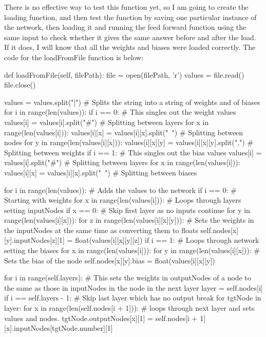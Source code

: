 \documentclass{report}
\begin{document}
There is no effective way to test this function yet, so I am going to create the loading function, and then test the function by saving one particular instance of the network, then loading it and running the feed forward function using the same input to check whether it gives the same answer before and after the load. If it does, I will know that all the weights and biases were loaded correctly.
\newpage
\noindent The code for the loadFromFile function is below:
\begin{python}
 def loadFromFile(self, filePath):
    file = open(filePath, 'r')
    values = file.read()
    file.close()
    
    values = values.split("|") # Splits the string into a string of weights and of biases
    for i in range(len(values)):
        if i == 0: # This singles out the weight values
            values[i] = values[i].split("#") # Splitting between layers
            for x in range(len(values[i])):
                values[i][x] = values[i][x].split("~") # Splitting between nodes
                for y in range(len(values[i][x])):
                    values[i][x][y] = values[i][x][y].split(",") # Splitting between weights
        if i == 1: # This singles out the bias values
            values[i] = values[i].split("#") # Splitting between layers
            for x in range(len(values[i])):
                values[i][x] = values[i][x].split("~") # Splitting between biases


    for i in range(len(values)): # Adds the values to the network
        if i == 0: # Starting with weights
            for x in range(len(values[i])): # Loops through layers setting inputNodes
                if x == 0: # Skip first layer as no inputs
                    continue
                for y in range(len(values[i][x])):
                    for z in range(len(values[i][x][y])):
                        # Sets the weights in the inputNodes at the same time as converting them to floats
                        self.nodes[x][y].inputNodes[z][1] = float(values[i][x][y][z])
        if i == 1: # Loops through network setting the biases
            for x in range(len(values[i])):
                for y in range(len(values[i][x])):
                    # Sets the bias of the node
                    self.nodes[x][y].bias = float(values[i][x][y])

    for i in range(self.layers): # This sets the weights in outputNodes of a node to the same as those in inputNodes in the node in the next layer
        layer = self.nodes[i]
        if i == self.layers - 1: # Skip last layer which has no output
            break
        for tgtNode in layer:
            for x in range(len(self.nodes[i + 1])):
                # loops through next layer and sets values and nodes.
                tgtNode.outputNodes[x][1] = self.nodes[i + 1][x].inputNodes[tgtNode.number][1]
\end{python}
\end{document}
